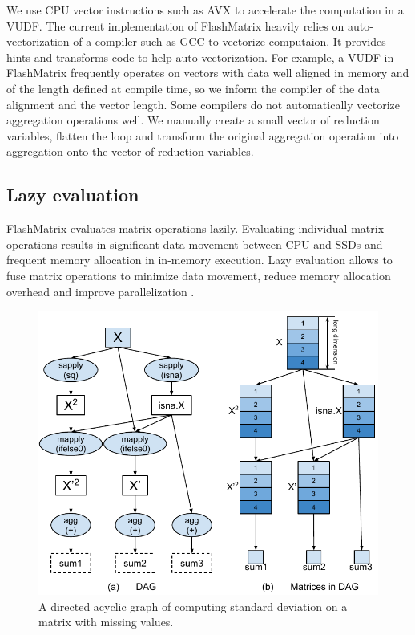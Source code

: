 We use CPU vector instructions such as AVX \cite{avx} to accelerate
the computation in a VUDF. The current implementation of FlashMatrix heavily
relies on auto-vectorization
of a compiler such as GCC to vectorize computaion. It provides hints and
transforms code to help auto-vectorization. For example, a VUDF in FlashMatrix
frequently operates on vectors with data well aligned in memory and of
the length defined at compile time, so we inform the compiler of the data alignment
and the vector length. Some compilers do not automatically vectorize
aggregation operations well. We manually create a small vector of reduction
variables, flatten the loop and transform the original aggregation operation
into aggregation onto the vector of reduction variables.

\subsection{Lazy evaluation} \label{sec:lazy_eval}
FlashMatrix evaluates matrix operations lazily. Evaluating individual
matrix operations results in significant data movement between CPU and SSDs
and frequent memory allocation in in-memory execution.
Lazy evaluation allows to fuse matrix operations to minimize data movement,
reduce memory allocation overhead and improve parallelization \cite{Ching12}.

\begin{figure}
	\centering
	\includegraphics[scale=0.7]{./sd.pdf}
	\caption{A directed acyclic graph of computing standard deviation on
	a matrix with missing values.}
	\label{fig:DAG}
\end{figure}

